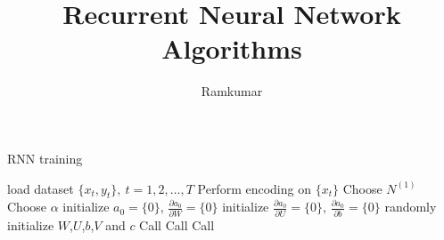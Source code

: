 \documentclass{article}
\title{Recurrent Neural Network Algorithms}
\author{Ramkumar}
\newcommand{\diag}[1]{diag({#1})}
\newcommand{\reshape}[2]{reshape \left({#1},\ {#2}\right)}
\newcommand{\bm}[1]{\textbf{#1}}
\newcommand{\der}[2]{\frac{\partial #1}{\partial #2}}
\begin{document}
\maketitle

\begin{algorithm}
    \renewcommand{\thealgorithm}{}
    \caption{RNN training}\label{alg:cap}
    \begin{algorithmic}
        \State load dataset $\{x_t,y_t\}, \ t=1,2,\dots,T$
        \State Perform encoding on $\{x_t\}$ 
        \State Choose $N^{(1)}$ 
        \State Choose $\alpha$ 
        \State initialize $a_0=\{0\}$, $\frac{\partial a_0}{\partial W} = \{0\}$
        \State initialize $\frac{\partial a_0}{\partial U}=\{0\}$, $\frac{\partial a_0}{\partial b} = \{0\}$
        \State randomly initialize $W$,$U$,$b$,$V$ and $c$ 
        \Repeat
        \State Call 
        \State Call 
        \State Call 

\end{algorithmic}
\end{algorithm}
\end{document}
